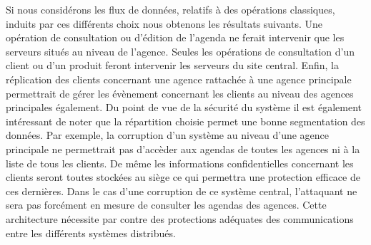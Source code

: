Si nous considérons les flux de données, relatifs à des opérations classiques, induits par ces différents choix nous obtenons les résultats suivants. Une opération de consultation ou d'édition de l'agenda ne ferait intervenir que les serveurs situés au niveau de l'agence. Seules les opérations de consultation d'un client ou d'un produit feront intervenir les serveurs du site central. Enfin, la réplication des clients concernant une agence rattachée à une agence principale permettrait de gérer les évènement concernant les clients au niveau des agences principales également.
Du point de vue de la sécurité du système il est également intéressant de noter que la répartition choisie permet une bonne segmentation des données. Par exemple, la corruption d'un système au niveau d'une agence principale ne permettrait pas d'accèder aux agendas de toutes les agences ni à la liste de tous les clients. De même les informations confidentielles concernant les clients seront toutes stockées au siège ce qui permettra une protection efficace de ces dernières. Dans le cas d'une corruption de ce système central, l'attaquant ne sera pas forcément en mesure de consulter les agendas des agences. Cette architecture nécessite par contre des protections adéquates des communications entre les différents systèmes distribués.

